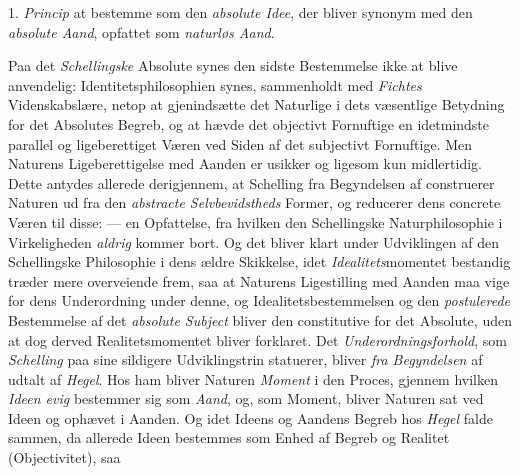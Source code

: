 1. \emph{Princip} at bestemme som den \emph{absolute Idee}, der
bliver synonym med den \emph{absolute Aand}, opfattet som \emph{naturløs
Aand}.

Paa det \emph{Schellingske} Absolute synes den sidste Bestemmelse
ikke at blive anvendelig: Identitetsphilosophien synes,
sammenholdt med \emph{Fichtes} Videnskabslære, netop at
gjenindsætte det Naturlige i dets væsentlige Betydning for det
Absolutes Begreb, og at hævde det objectivt Fornuftige en
idetmindste parallel og ligeberettiget Væren ved Siden af det
subjectivt Fornuftige. Men Naturens Ligeberettigelse med Aanden
er usikker og ligesom kun midlertidig. Dette antydes allerede
derigjennem, at Schelling fra Begyndelsen af construerer
Naturen ud fra den \emph{abstracte Selvbevidstheds} Former,
og reducerer dens concrete Væren til disse: --- en Opfattelse,
fra hvilken den Schellingske Naturphilosophie i Virkeligheden
\emph{aldrig} kommer bort. Og det bliver klart under Udviklingen
af den Schellingske Philosophie i dens ældre Skikkelse, idet
\emph{Idealitets}momentet bestandig træder mere overveiende frem,
saa at Naturens Ligestilling med Aanden maa vige for dens
Underordning under denne, og Idealitetsbestemmelsen og den
\emph{postulerede} Bestemmelse af det \emph{absolute Subject} bliver
den constitutive for det Absolute, uden at dog derved Realitetsmomentet
bliver forklaret. Det \emph{Underordningsforhold},
som \emph{Schelling} paa sine sildigere Udviklingstrin statuerer,
bliver \emph{fra Begyndelsen} af udtalt af \emph{Hegel}. Hos ham bliver
Naturen \emph{Moment} i den Proces, gjennem hvilken \emph{Ideen
evig} bestemmer sig som \emph{Aand}, og, som Moment, bliver Naturen
sat ved Ideen og ophævet i Aanden. Og idet Ideens og
Aandens Begreb hos \emph{Hegel} falde sammen, da allerede Ideen
bestemmes som Enhed af Begreb og Realitet (Objectivitet), saa
